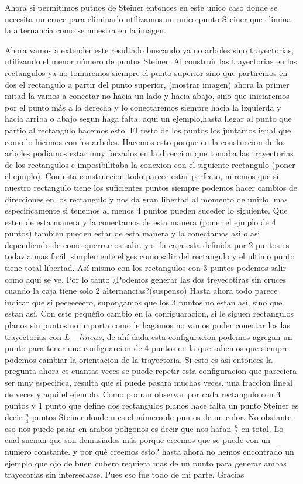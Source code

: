 \documentclass[11pt,a4paper]{article}
\begin{document}
Ahora si permitimos putnos de Steiner entonces en este unico caso donde se necesita un cruce para eliminarlo utilizamos un unico punto Steiner que elimina la alternancia  como se muestra en la imagen. 

Ahora vamos a extender este resultado buscando ya no arboles sino trayectorias, utilizando el menor número de puntos Steiner. 
Al construir las trayectorias en los rectangulos ya no tomaremos siempre el punto superior sino que partiremos en dos el rectangulo a partir del punto superior, (mostrar imagen) ahora la primer mitad la vamos a conectar no hacia un lado y hacia abajo, sino que iniciaremos por el punto más a la derecha y lo conectaremos siempre hacia la izquierda y hacia arriba o abajo segun haga falta. aqui un ejemplo,hasta llegar al punto que partio al rectangulo hacemos esto. El resto de los puntos los juntamos igual que como lo hicimos con los arboles. Hacemos esto porque en la constuccion de los arboles podiamos estar muy forzados en la direccion que tomaba las trayectorias de los rectangulos e imposibilitaba la conexion con el siguiente rectangulo (poner el ejmplo). Con esta construccion todo parece estar perfecto, miremos que si nuestro rectangulo tiene los suficientes puntos siempre podemos hacer cambios de direcciones en los rectangulo y nos da gran libertad al momento de unirlo, mas especificamente si tenemos al menos 4 puntos pueden suceder lo siguiente. Que esten de esta manera y la conectamos de esta manera (poner el ejmplo de 4 puntos) tambien pueden estar de esta manera y la conectamos asi o asi dependiendo de como querramos salir. y si la caja esta definida por 2 puntos es todavia mas facil, simplemente eliges como salir del rectangulo y el ultimo punto tiene total libertad. Así mismo con los rectangulos con 3 puntos podemos salir como aqui se ve. Por lo tanto ¿Podemos generar las dos treyecotiras sin cruces cuando la caja tiene solo 2 alternancias?(suspenso) Hasta ahora todo parece indicar que sí peeeeeeero, supongamos que los 3 puntos no estan así, sino que estan así. Con este pequéño cambio en la configuaracion, si le siguen rectangulos planos sin puntos no importa como le hagamos no vamos poder conectar los las trayectorias con $L-lineas$, de ahí dada esta configuracion podemos agregan un punto para tener una configuarcion de 4 puntos en la que sabemos que siempre podemos cambiar la orientacion de la trayectoria. Si esto es así entonces la pregunta ahora es cuantas veces se puede repetir esta configuracion que pareciera ser muy especifica, resulta que sí puede pasara muchas veces, una fraccion lineal de veces y aqui el ejemplo. Como podran observar por cada rectangulo con 3 puntos y 1 punto que define dos rectangulos planos hace falta un punto Steiner es decir $\frac{n}{4}$ puntos Steiner donde n es el número de puntos de un color. No obstante eso nos puede pasar en ambos poligonos es decir que nos haŕan $\frac{n}{2}$ en total. Lo cual suenan que son demasiados más porque creemos que se puede con un numero constante. y por qué creemos esto? hasta ahora no hemos encontrado un ejemplo que ojo de buen cubero requiera mas de un punto para generar ambas trayecorias sin intersecarse. Pues eso fue todo de mi parte. Gracias 
\end{document}
